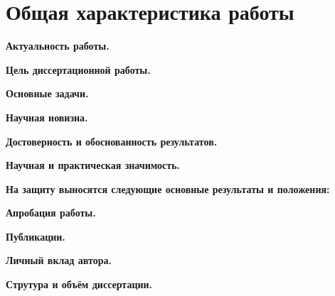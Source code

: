 \section*{Общая характеристика работы}

\textbf{Актуальность работы.}

\textbf{Цель диссертационной работы.}

\textbf{Основные задачи.}

\textbf{Научная новизна.}

\textbf{Достоверность и обоснованность результатов.}

\textbf{Научная и практическая значимость.}

\textbf{На защиту выносятся следующие основные результаты и положения:}

\textbf{Апробация работы.}

\textbf{Публикации.}

\textbf{Личный вклад автора.}

\textbf{Струтура и объём диссертации.}
